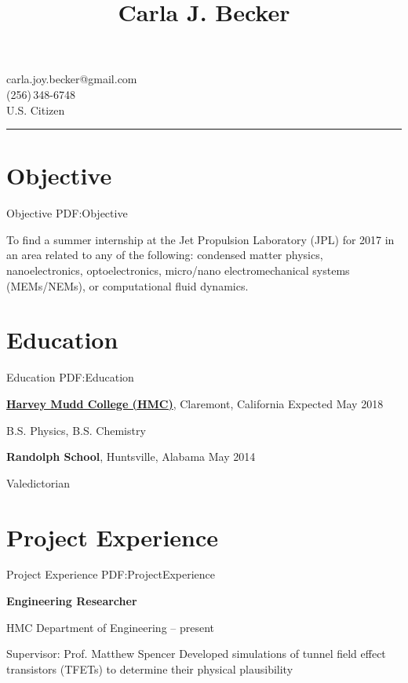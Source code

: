 \documentclass[letterpaper,10pt,oneside]{article}
\newcommand{\CVAuthor}{Carla J. Becker}
\begin{document}

\title{\CVAuthor}

\begin{subtitle}
carla.joy.becker@gmail.com
\\
(256)\,348-6748 
\\
U.S. Citizen
\end{subtitle}
\vspace{2mm}
\hrule
\begin{body}


\section
{Objective}
{Objective}
{PDF:Objective}

To find a summer internship at the Jet Propulsion Laboratory (JPL) for 2017 in an area related to any of the following: condensed matter physics, nanoelectronics, optoelectronics, micro/nano electromechanical systems (MEMs/NEMs), or computational fluid dynamics.


\section
{Education}
{Education}
{PDF:Education}

\href{https://www.hmc.edu/}
{\textbf{Harvey Mudd College (HMC)}},
Claremont, California
\hfill
Expected May 2018

\GapNoBreak
\BulletItem
B.S. Physics, B.S. Chemistry

\Gap
{\textbf{Randolph School}},
Huntsville, Alabama
\hfill
May 2014

\GapNoBreak
\BulletItem
Valedictorian


\section
{Project Experience}
{Project Experience}
{PDF:ProjectExperience}

{\textbf{Engineering Researcher}}

\GapNoBreak
\BulletItem
HMC Department of Engineering
\hfill
{} --
present
\begin{detail}
\SubBulletItem
Supervisor:
Prof. Matthew Spencer
\SubBulletItemBullet
Developed simulations of tunnel field effect transistors (TFETs) to determine their physical plausibility
\end{detail}


\end{body}
\end{document}
